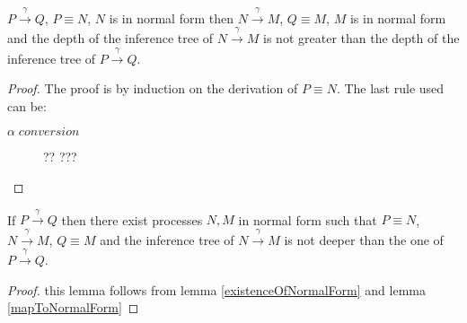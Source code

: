 \begin{lemma}\label{mapToNormalForm}
  $P \xrightarrow{\gamma} Q$, $P\equiv N$, $N$ is in normal form then $N \xrightarrow{\gamma} M$, $Q\equiv M$, $M$ is in normal form and the depth of the inference tree of $N \xrightarrow{\gamma} M$ is not greater than the depth of the inference tree of $P \xrightarrow{\gamma} Q$.
  \begin{proof}
    The proof is by induction on the derivation of $P\equiv N$. The last rule used can be:
    \begin{description}
      \item[$\alpha\; conversion$] 
	?? ???
    \end{description}
  \end{proof}
\end{lemma}

\begin{lemma}
  If $P \xrightarrow{\gamma} Q$ then there exist processes $N,M$ in normal form such that $P\equiv N$, $N \xrightarrow{\gamma} M$, $Q\equiv M$ and the inference tree of $N \xrightarrow{\gamma} M$ is not deeper than the one of $P \xrightarrow{\gamma} Q$.
  \begin{proof}
    this lemma follows from lemma \ref{existenceOfNormalForm} and lemma \ref{mapToNormalForm}
  \end{proof}
\end{lemma}

\begin{lemma}\label{inversionLemmaStructNorm}
  
\end{lemma}

